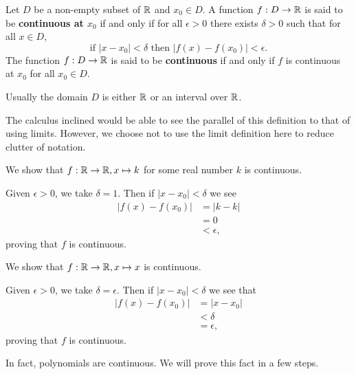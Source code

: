 \begin{definition}
    Let $D$ be a non-empty subset of $\mathbb{R}$ and $x_0 \in D$. A function $f: D \to \mathbb{R}$ is said to be \textbf{continuous at $x_0$} if and only if for all $\epsilon > 0$ there exists $\delta > 0$ such that for all $x \in D$,
    \[
        \text{if } |x - x_0| < \delta \text{ then } |f(x) - f(x_0)| < \epsilon.
    \]
    The function $f: D \to \mathbb{R}$ is said to be \textbf{continuous} if and only if $f$ is continuous at $x_0$ for all $x_0 \in D$.
\end{definition}
\begin{remark}
    Usually the domain $D$ is either $\mathbb{R}$ or an interval over $\mathbb{R}$.
\end{remark}

The calculus inclined would be able to see the parallel of this definition to that of using limits. However, we choose not to use the limit definition here to reduce clutter of notation.

\begin{example}\label{example-constant-function-is-continuous}
    We show that $f: \mathbb{R} \to \mathbb{R}, x \mapsto k$ for some real number $k$ is continuous.

    Given $\epsilon > 0$, we take $\delta = 1$. Then if $|x - x_0| < \delta$ we see
    \begin{align*}
        |f(x) - f(x_0)| &= |k - k|\\
        &= 0\\
        &< \epsilon,
    \end{align*}
    proving that $f$ is continuous.
\end{example}

\begin{example}\label{example-identity-polynomial-is-continuous}
    We show that $f: \mathbb{R} \to \mathbb{R}, x \mapsto x$ is continuous.

    Given $\epsilon > 0$, we take $\delta = \epsilon$. Then if $|x - x_0| < \delta$ we see that
    \begin{align*}
        |f(x) - f(x_0)| &= |x - x_0|\\
        &< \delta\\
        &= \epsilon,
    \end{align*}
    proving that $f$ is continuous.
\end{example}

In fact, polynomials are continuous. We will prove this fact in a few steps.

